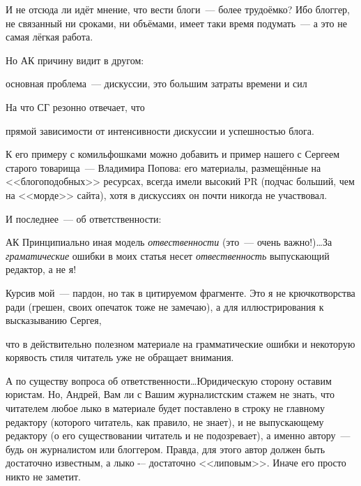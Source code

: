 И не отсюда ли идёт мнение, что вести блоги~--- более трудоёмко? Ибо блоггер, не связанный ни сроками, ни объёмами, имеет таки время подумать~--- а это не самая лёгкая работа.

Но АК причину видит в другом:


\begin{shadequote}{}
основная проблема~--- дискуссии, это большим затраты времени и сил
\end{shadequote}

На что СГ резонно отвечает, что


\begin{shadequote}{}
 прямой зависимости от интенсивности дискуссии и успешностью блога.
\end{shadequote}

К его примеру с комильфошками можно добавить и пример нашего с Сергеем старого товарища~--- Владимира Попова: его материалы, размещённые на <<блогоподобных>> ресурсах, всегда имели высокий PR (подчас больший, чем на <<морде>> сайта), хотя в дискуссиях он почти никогда не участвовал.

И последнее~--- об ответственности:



\begin{shadequote}[r]{АК}
Принципиально иная модель \textit{отвественности} (это~--- очень важно!)\dots За \textit{граматические} ошибки в моих статья несет \textit{отвественность} выпускающий редактор, а не я!
\end{shadequote}

Курсив мой~--- пардон, но так в цитируемом фрагменте. Это я не крючкотворства ради (грешен, своих опечаток тоже не замечаю), а для иллюстрирования к высказыванию Сергея,


\begin{shadequote}{}
что в действительно полезном материале на грамматические ошибки и некоторую корявость стиля читатель уже не обращает внимания.
\end{shadequote}

А по существу вопроса об ответственности\dots Юридическую сторону оставим юристам. Но, Андрей, Вам ли с Вашим журналистским стажем не знать, что читателем любое лыко в материале будет поставлено в строку не главному редактору (которого читатель, как правило, не знает), и не выпускающему редактору (о его существовании читатель и не подозревает), а именно автору~--- будь он журналистом или блоггером. Правда, для этого автор должен быть достаточно известным, а лыко -– достаточно <<липовым>>. Иначе его просто никто не заметит.

